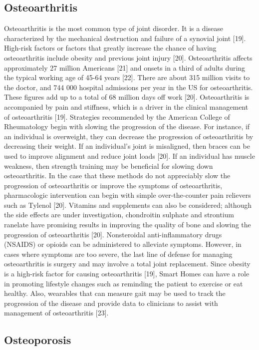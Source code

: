 \subsection{Osteoarthritis}
Osteoarthritis is the most common type of joint disorder. It is a disease characterized by the mechanical destruction and failure of a synovial joint [19]. High-risk factors or factors that greatly increase the chance of having osteoarthritis include obesity and previous joint injury [20]. Osteoarthritis affects approximately 27 million Americans [21] and onsets in a third of adults during the typical working age of 45-64 years [22]. There are about 315 million visits to the doctor, and 744 000 hospital admissions per year in the US for osteoarthritis. These figures add up to a total of 68 million days off work [20].
Osteoarthritis is accompanied by pain and stiffness, which is a driver in the clinical management of osteoarthritis [19]. Strategies recommended by the American College of Rheumatology begin with slowing the progression of the disease. For instance, if an individual is overweight, they can decrease the progression of osteoarthritis by decreasing their weight. If an individual’s joint is misaligned, then braces can be used to improve alignment and reduce joint loads [20]. If an individual has muscle weakness, then strength training may be beneficial for slowing down osteoarthritis. 
In the case that these methods do not appreciably slow the progression of osteoarthritis or improve the symptoms of osteoarthritis, pharmacologic intervention can begin with simple over-the-counter pain relievers such as Tylenol [20]. Vitamins and supplements can also be considered; although the side effects are under investigation, chondroitin sulphate and strontium ranelate have promising results in improving the quality of bone and slowing the progression of osteoarthritis [20]. Nonsteroidal anti-inflammatory drugs (NSAIDS) or opioids can be administered to alleviate symptoms. However, in cases where symptoms are too severe, the last line of defense for managing osteoarthritis is surgery and may involve a total joint replacement.
Since obesity is a high-risk factor for causing osteoarthritis [19], Smart Homes can have a role in promoting lifestyle changes such as reminding the patient to exercise or eat healthy. Also, wearables that can measure gait may be used to track the progression of the disease and provide data to clinicians to assist with management of osteoarthritis [23].


\subsection{Osteoporosis}



